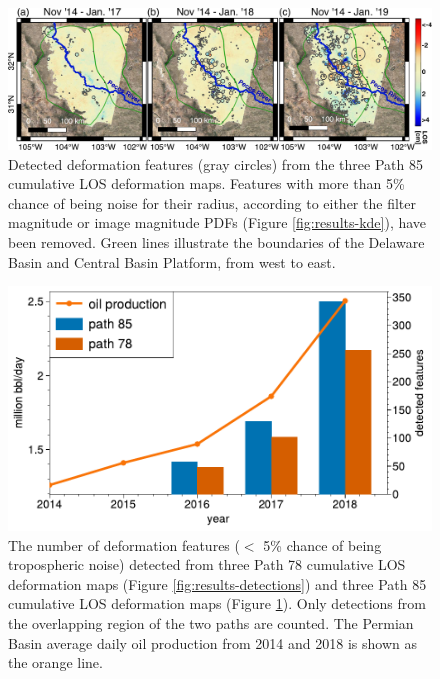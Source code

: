 \begin{figure}
	\centering 
	\includegraphics[width=0.98\linewidth]{figures/chapter6-blobs/figure_discussion_blobs_combined_path85.pdf}
	\caption[Detected deformation features for Path 85]{
		Detected deformation features (gray circles) from the three Path 85 cumulative LOS deformation maps. Features with more than 5\% chance of being noise for their radius, according to either the filter magnitude or image magnitude PDFs (Figure \ref{fig:results-kde}), have been removed. Green lines illustrate the boundaries of the Delaware Basin and Central Basin Platform, from west to east.
	}
	\label{fig:discussion-detections-85}
\end{figure}


\begin{figure}
	\centering 
	\includegraphics[width=.75\linewidth]{figures/chapter6-blobs/figure_discussion_oil_vs_blob_count_1col.pdf}
	\caption[Detected deformation features vs daily Permian Basin oil production]{
		The number of deformation features ($<$ 5\% chance of being tropospheric noise) detected from three Path 78 cumulative LOS deformation maps (Figure \ref{fig:results-detections}) and three Path 85 cumulative LOS deformation maps (Figure \ref{fig:discussion-detections-85}). Only detections from the overlapping region of the two paths are counted. The Permian Basin average daily oil production from 2014 and 2018 is shown as the orange line.
	}
	\label{fig:discussion-oil-blob-count}
\end{figure}
